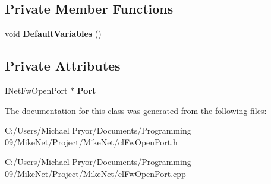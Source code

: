 \subsection*{Private Member Functions}
\begin{DoxyCompactItemize}
\item 
\hypertarget{classcl_fw_open_port_aef04e09c439865dfccf12c04c17e55f6}{
void {\bfseries DefaultVariables} ()}
\label{classcl_fw_open_port_aef04e09c439865dfccf12c04c17e55f6}

\end{DoxyCompactItemize}
\subsection*{Private Attributes}
\begin{DoxyCompactItemize}
\item 
\hypertarget{classcl_fw_open_port_a44814ee6346e4d21110b9afb038c0e75}{
INetFwOpenPort $\ast$ {\bfseries Port}}
\label{classcl_fw_open_port_a44814ee6346e4d21110b9afb038c0e75}

\end{DoxyCompactItemize}


The documentation for this class was generated from the following files:\begin{DoxyCompactItemize}
\item 
C:/Users/Michael Pryor/Documents/Programming 09/MikeNet/Project/MikeNet/clFwOpenPort.h\item 
C:/Users/Michael Pryor/Documents/Programming 09/MikeNet/Project/MikeNet/clFwOpenPort.cpp\end{DoxyCompactItemize}
